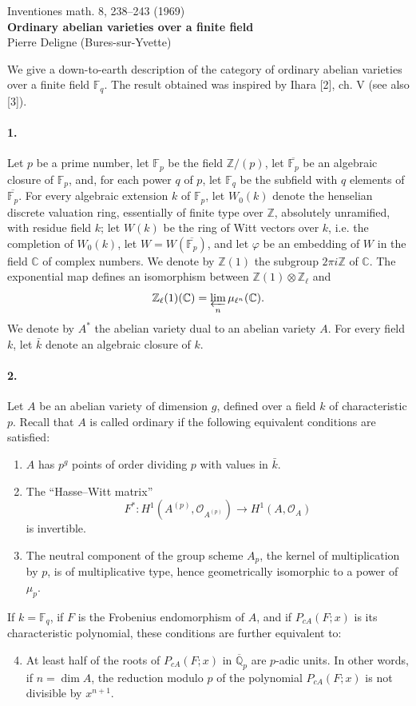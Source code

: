 \documentclass[10pt]{article}
\newcommand{\C}{\mathbb C}
\newcommand{\Fp}{\mathbb F_p}
\newcommand{\Fq}{\mathbb F_q}
\newcommand{\Q}{\mathbb Q}
\newcommand{\Z}{\mathbb Z}
\begin{document}
\begin{center}
{\small Inventiones math. 8, 238--243 (1969)}\\[3.0em]
{\Large\bfseries Ordinary abelian varieties over a finite field}\\[1.0em]
{\large Pierre Deligne (Bures-sur-Yvette)}
\end{center}

We give a down-to-earth description of the category of ordinary abelian varieties over a finite field $\Fq$. The result obtained was inspired by Ihara [2], ch. V (see also [3]).

\paragraph{1.} Let $p$ be a prime number, let $\Fp$ be the field $\Z/(p)$, let $\overline{\Fp}$ be an algebraic closure of $\Fp$, and, for each power $q$ of $p$, let $\Fq$ be the subfield with $q$ elements of $\overline{\Fp}$. For every algebraic extension $k$ of $\Fp$, let $W_0(k)$ denote the henselian discrete valuation ring, essentially of finite type over $\Z$, absolutely unramified, with residue field $k$; let $W(k)$ be the ring of Witt vectors over $k$, i.e. the completion of $W_0(k)$, let $W=W(\overline{\Fp})$, and let $\varphi$ be an embedding of $W$ in the field $\C$ of complex numbers. We denote by $\Z(1)$ the subgroup $2\pi i\Z$ of $\C$. The exponential map defines an isomorphism between $\Z(1)\otimes\Z_\ell$ and
\[
\Z_\ell(1)(\C)=\varprojlim_n\mu_{\ell^n}(\C).
\]
We denote by $A^*$ the abelian variety dual to an abelian variety $A$. For every field $k$, let $\bar k$ denote an algebraic closure of $k$.

\paragraph{2.} Let $A$ be an abelian variety of dimension $g$, defined over a field $k$ of characteristic $p$. Recall that $A$ is called ordinary if the following equivalent conditions are satisfied:
\begin{enumerate}[label=(\Roman*)]
\item $A$ has $p^g$ points of order dividing $p$ with values in $\bar k$.
\item The ``Hasse--Witt matrix''
\[
F^*:H^1(A^{(p)},\mathcal O_{A^{(p)}})\longrightarrow H^1(A,\mathcal O_A)
\]
is invertible.
\item The neutral component of the group scheme $A_p$, the kernel of multiplication by $p$, is of multiplicative type, hence geometrically isomorphic to a power of $\mu_p$.
\end{enumerate}
If $k=\Fq$, if $F$ is the Frobenius endomorphism of $A$, and if $P_{cA}(F;x)$ is its characteristic polynomial, these conditions are further equivalent to:
\begin{enumerate}[label=(\Roman*)]
\setcounter{enumi}{3}
\item At least half of the roots of $P_{cA}(F;x)$ in $\overline{\Q}_p$ are $p$-adic units. In other words, if $n=\dim A$, the reduction modulo $p$ of the polynomial $P_{cA}(F;x)$ is not divisible by $x^{n+1}$.
\end{enumerate}
\end{document}
